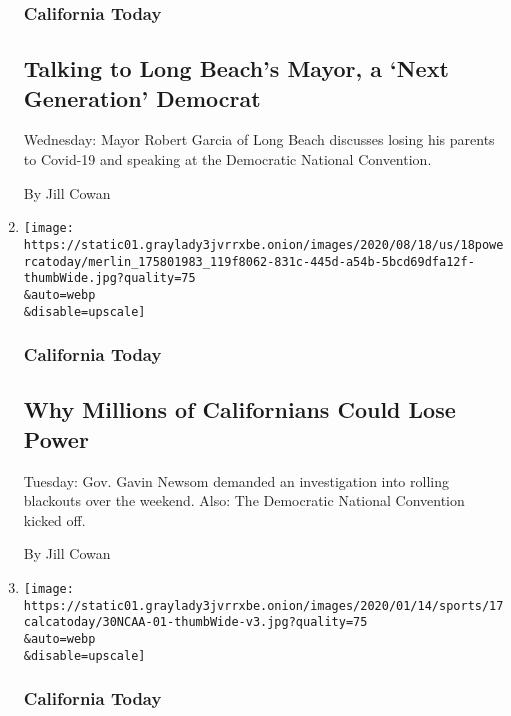 \begin{enumerate}
{  \subsubsection{California Today}\label{california-today}}

  \hypertarget{talking-to-long-beachs-mayor-a-next-generation-democrat}{%
  \subsection{Talking to Long Beach's Mayor, a `Next Generation'
  Democrat}\label{talking-to-long-beachs-mayor-a-next-generation-democrat}}

  Wednesday: Mayor Robert Garcia of Long Beach discusses losing his
  parents to Covid-19 and speaking at the Democratic National
  Convention.

  By Jill Cowan
\item
  \href{/2020/08/18/us/california-blackouts.html}{}

  \texttt{[image: https://static01.graylady3jvrrxbe.onion/images/2020/08/18/us/18powercatoday/merlin\_175801983\_119f8062-831c-445d-a54b-5bcd69dfa12f-thumbWide.jpg?quality=75\\\&auto=webp\\\&disable=upscale]}

  \hypertarget{california-today-1}{%
  \subsubsection{California Today}\label{california-today-1}}

  \hypertarget{why-millions-of-californians-could-lose-power}{%
  \subsection{Why Millions of Californians Could Lose
  Power}\label{why-millions-of-californians-could-lose-power}}

  Tuesday: Gov. Gavin Newsom demanded an investigation into rolling
  blackouts over the weekend. Also: The Democratic National Convention
  kicked off.

  By Jill Cowan
\item
  \href{/2020/08/17/us/pac-12-football-california.html}{}

  \texttt{[image: https://static01.graylady3jvrrxbe.onion/images/2020/01/14/sports/17calcatoday/30NCAA-01-thumbWide-v3.jpg?quality=75\\\&auto=webp\\\&disable=upscale]}

  \hypertarget{california-today-2}{%
  \subsubsection{California Today}\label{california-today-2}}


\end{enumerate}

